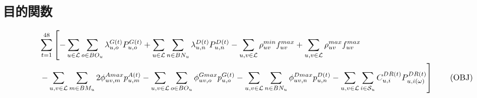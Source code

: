 \documentclass[a4j,10.5pt]{jarticle}
\begin{document}
\subsection{目的関数}
\begin{align}
&\sum_{t=1}^{48} \left[-\sum_{u\in \mathcal{L}} \sum_{o\in BO_u}\lambda_{u,o}^{G(t)}P_{u,o}^{G(t)}+\sum_{u\in \mathcal{L}} \sum_{n\in BN_u}\lambda_{u,n}^{D(t)}P_{u,n}^{D(t)}-\sum_{u,v\in \mathcal{L}}\rho_{uv}^{min}f_{uv}^{max}+\sum_{u,v\in \mathcal{L}}\rho_{uv}^{max}f_{uv}^{max}
\notag \right. \\
&\left.-\sum_{u,v\in \mathcal{L}} \sum_{m\in BM_u}2\phi_{uv,m}^{Amax}p_{u,m}^{A(t)}-\sum_{u,v\in \mathcal{L}} \sum_{o\in BO_u}\phi_{uv,o}^{Gmax}p_{u,o}^{G(t)}-\sum_{u,v\in \mathcal{L}} \sum_{n\in BN_u}\phi_{uv,n}^{Dmax}p_{u,n}^{D(t)}-\sum_{u,v\in \mathcal{L}}\sum_{i\in \mathcal{S}_u}C_{u,i}^{DR(t)}P_{u,i(\omega)}^{DR(t)}\right]\tag{OBJ}
\end{align}
\end{document}
